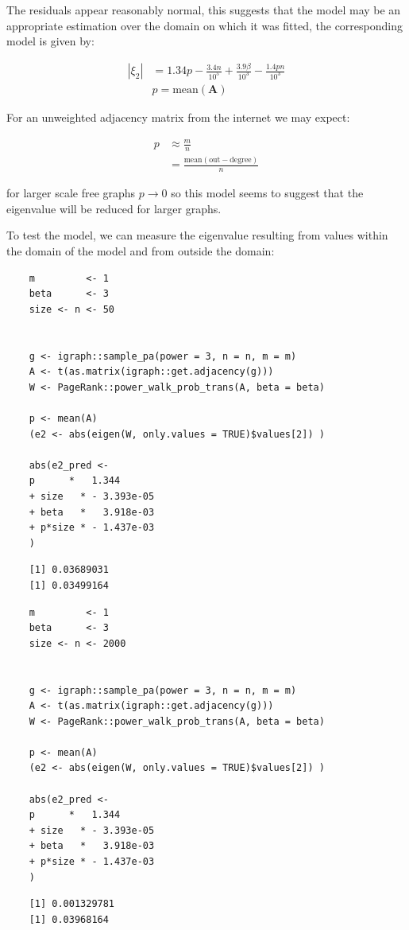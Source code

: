 \documentclass[11pt]{report}
\begin{document}
The residuals appear reasonably normal, this suggests that the model may be an appropriate estimation over the domain on which it was fitted, the corresponding model is given by:

\begin{align}
\left\lvert \xi_{2} \right\rvert &= 1.34 p -  \frac{3.4n}{10^{5}} + \frac{3.9\beta}{10^{3}} - \frac{1.4 p n}{10^{3}} \\
        &p = \mathrm{mean}\left( \mathbf{A}\right)
\end{align}

For an unweighted adjacency matrix from the internet we may expect:

\begin{align}
p &\approx \frac{m}{n} \\
  &= \frac{\mathrm{mean}\left(\mathrm{out-degree}\right)}{n}
\end{align}

for larger scale free graphs \(p \rightarrow 0\) so this model seems to suggest that the eigenvalue will be reduced for larger graphs.

To test the model, we can measure the eigenvalue resulting from values within the domain of the model and from outside the domain:

\begin{tcolorbox}
    \begin{verbatim}
    m         <- 1
    beta      <- 3
    size <- n <- 50


    g <- igraph::sample_pa(power = 3, n = n, m = m)
    A <- t(as.matrix(igraph::get.adjacency(g)))
    W <- PageRank::power_walk_prob_trans(A, beta = beta)

    p <- mean(A)
    (e2 <- abs(eigen(W, only.values = TRUE)$values[2]) )

    abs(e2_pred <-
    p      *   1.344
    + size   * - 3.393e-05
    + beta   *   3.918e-03
    + p*size * - 1.437e-03
    )
    \end{verbatim}
\tcblower
    \begin{verbatim}
    [1] 0.03689031
    [1] 0.03499164
    \end{verbatim}
\end{tcolorbox}


\begin{tcolorbox}
    \begin{verbatim}
    m         <- 1
    beta      <- 3
    size <- n <- 2000


    g <- igraph::sample_pa(power = 3, n = n, m = m)
    A <- t(as.matrix(igraph::get.adjacency(g)))
    W <- PageRank::power_walk_prob_trans(A, beta = beta)

    p <- mean(A)
    (e2 <- abs(eigen(W, only.values = TRUE)$values[2]) )

    abs(e2_pred <-
    p      *   1.344
    + size   * - 3.393e-05
    + beta   *   3.918e-03
    + p*size * - 1.437e-03
    )
    \end{verbatim}
\tcblower
    \begin{verbatim}
    [1] 0.001329781
    [1] 0.03968164
    \end{verbatim}
\end{tcolorbox}
\end{document}
